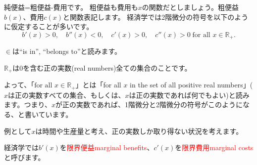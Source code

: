 \begin{frame}{}
純便益=粗便益-費用です。
\pause
粗便益も費用も$x$の関数だとしましょう。粗便益$b(x)$、費用$c(x)$と関数表記します。
\pause 
経済学では2階微分の符号を以下のように仮定することが多いです。
\[
b'(x) > 0, \quad b''(x)<0, \quad c'(x)>0, \quad c''(x)>0 \; \mbox{for all }x\in\mathbb R_{+}.
\]
\begin{dinglist}{43}
\vspace{1.0ex}\setlength{\itemsep}{1.0ex}\setlength{\baselineskip}{12pt}
\pause 
\item	$\in$は``is in'', ``belongs to''と読みます。
\pause 
\item	$\mathbb R_{+}$は0を含む正の実数(real numbers)全ての集合のことです。\\[2ex]
\end{dinglist}
\pause 
よって、「$\mbox{for all }x\in\mathbb R_{+}$」とは「for all $x$ in the set of all positive real numbers」($x$は正の実数すべての集合、もしくは、$x$は正の実数であれば何でもよい)と読みます。\pause つまり、$x$が正の実数であれば、1階微分と2階微分の符号がこのようになる、と書いています。
\begin{dinglist}{43}
\vspace{1.0ex}\setlength{\itemsep}{1.0ex}\setlength{\baselineskip}{12pt}
\pause 
\item	例として$x$は時間や生産量と考え、正の実数しか取り得ない状況を考えます。
\end{dinglist}

\vspace{2ex}
\pause 
経済学では$b'(x)$を\textcolor{red}{限界便益marginal benefits}、$c'(x)$を\textcolor{red}{限界費用marginal costs}と呼びます。
\end{frame}

